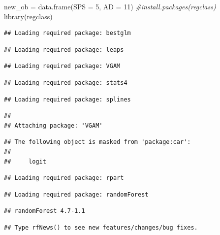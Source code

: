 \documentclass[
]{article}
\newenvironment{Shaded}{\begin{snugshade}}{\end{snugshade}}
\newcommand{\AttributeTok}[1]{\textcolor[rgb]{0.77,0.63,0.00}{#1}}
\newcommand{\CommentTok}[1]{\textcolor[rgb]{0.56,0.35,0.01}{\textit{#1}}}
\newcommand{\DecValTok}[1]{\textcolor[rgb]{0.00,0.00,0.81}{#1}}
\newcommand{\FunctionTok}[1]{\textcolor[rgb]{0.00,0.00,0.00}{#1}}
\newcommand{\NormalTok}[1]{#1}
\newcommand{\OtherTok}[1]{\textcolor[rgb]{0.56,0.35,0.01}{#1}}
\begin{document}
\begin{Shaded}
\begin{Highlighting}[]
\NormalTok{new\_ob }\OtherTok{=} \FunctionTok{data.frame}\NormalTok{(}\AttributeTok{SPS =} \DecValTok{5}\NormalTok{, }\AttributeTok{AD =} \DecValTok{11}\NormalTok{)}
\CommentTok{\#install.packages(\textquotesingle{}regclass\textquotesingle{})}
\FunctionTok{library}\NormalTok{(regclass)}
\end{Highlighting}
\end{Shaded}

\begin{verbatim}
## Loading required package: bestglm
\end{verbatim}

\begin{verbatim}
## Loading required package: leaps
\end{verbatim}

\begin{verbatim}
## Loading required package: VGAM
\end{verbatim}

\begin{verbatim}
## Loading required package: stats4
\end{verbatim}

\begin{verbatim}
## Loading required package: splines
\end{verbatim}

\begin{verbatim}
## 
## Attaching package: 'VGAM'
\end{verbatim}

\begin{verbatim}
## The following object is masked from 'package:car':
## 
##     logit
\end{verbatim}

\begin{verbatim}
## Loading required package: rpart
\end{verbatim}

\begin{verbatim}
## Loading required package: randomForest
\end{verbatim}

\begin{verbatim}
## randomForest 4.7-1.1
\end{verbatim}

\begin{verbatim}
## Type rfNews() to see new features/changes/bug fixes.
\end{verbatim}
\end{document}
